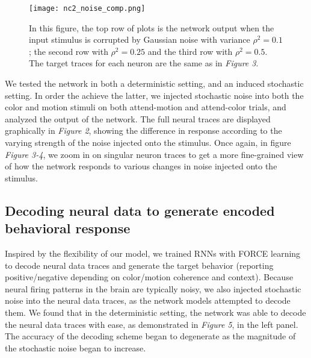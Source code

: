 \documentclass[12pt,a4paper,final]{iopart}
\begin{document}
\begin{figure}[h!]
 \centering
 \texttt{[image: nc2\_noise\_comp.png]}
 \caption{In this figure, the top row of plots is the network output when the input stimulus is corrupted by Gaussian noise with variance $\rho^2 = 0.1$; the second row with  $\rho^2 = 0.25$ and the third row with $\rho^2 = 0.5$. The target traces for each neuron are the same as in \emph{Figure 3}.}
\end{figure}

We tested the network in both a deterministic setting, and an induced stochastic setting. In order the achieve the latter, we injected stochastic noise into both the color and motion stimuli on both attend-motion and attend-color trials, and analyzed the output of the network. The full neural traces are displayed graphically in \emph{Figure 2}, showing the difference in response according to the varying strength of the noise injected onto the stimulus. Once again, in figure \emph{Figure 3-4}, we zoom in on singular neuron traces to get a more fine-grained view of how the network responds to various changes in noise injected onto the stimulus.

\subsection{Decoding neural data to generate encoded behavioral response}
Inspired by the flexibility of our model, we trained RNNs with FORCE learning to decode neural data traces and generate the target behavior (reporting positive/negative depending on color/motion coherence and context). Because neural firing patterns in the brain are typically noisy, we also injected stochastic noise into the neural data traces, as the network models attempted to decode them. We found that in the deterministic setting, the network was able to decode the neural data traces with ease, as demonstrated in \emph{Figure 5}, in the left panel. The accuracy of the decoding scheme began to degenerate as the magnitude of the stochastic noise began to increase.
\end{document}
